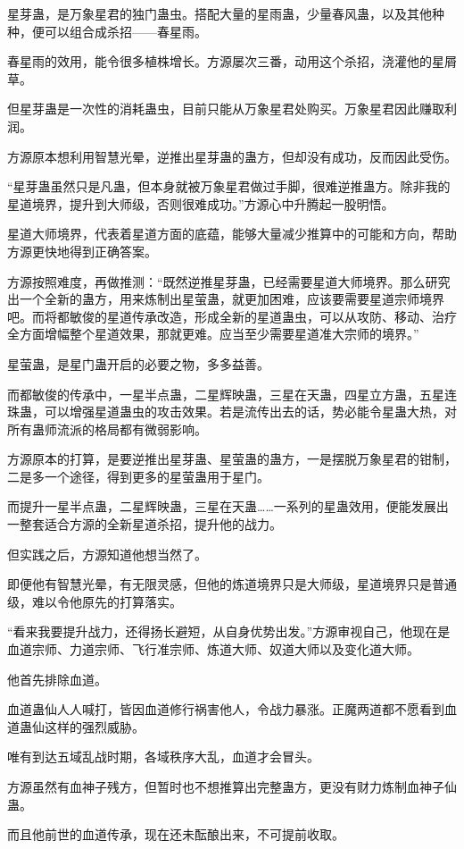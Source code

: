 \begin{this_body}
星芽蛊，是万象星君的独门蛊虫。搭配大量的星雨蛊，少量春风蛊，以及其他种种，便可以组合成杀招——春星雨。

春星雨的效用，能令很多植株增长。方源屡次三番，动用这个杀招，浇灌他的星屑草。

但星芽蛊是一次性的消耗蛊虫，目前只能从万象星君处购买。万象星君因此赚取利润。

方源原本想利用智慧光晕，逆推出星芽蛊的蛊方，但却没有成功，反而因此受伤。

“星芽蛊虽然只是凡蛊，但本身就被万象星君做过手脚，很难逆推蛊方。除非我的星道境界，提升到大师级，否则很难成功。”方源心中升腾起一股明悟。

星道大师境界，代表着星道方面的底蕴，能够大量减少推算中的可能和方向，帮助方源更快地得到正确答案。

方源按照难度，再做推测：“既然逆推星芽蛊，已经需要星道大师境界。那么研究出一个全新的蛊方，用来炼制出星萤蛊，就更加困难，应该要需要星道宗师境界吧。而将都敏俊的星道传承改造，形成全新的星道蛊虫，可以从攻防、移动、治疗全方面增幅整个星道效果，那就更难。应当至少需要星道准大宗师的境界。”

星萤蛊，是星门蛊开启的必要之物，多多益善。

而都敏俊的传承中，一星半点蛊，二星辉映蛊，三星在天蛊，四星立方蛊，五星连珠蛊，可以增强星道蛊虫的攻击效果。若是流传出去的话，势必能令星蛊大热，对所有蛊师流派的格局都有微弱影响。

方源原本的打算，是要逆推出星芽蛊、星萤蛊的蛊方，一是摆脱万象星君的钳制，二是多一个途径，得到更多的星萤蛊用于星门。

而提升一星半点蛊，二星辉映蛊，三星在天蛊……一系列的星蛊效用，便能发展出一整套适合方源的全新星道杀招，提升他的战力。

但实践之后，方源知道他想当然了。

即便他有智慧光晕，有无限灵感，但他的炼道境界只是大师级，星道境界只是普通级，难以令他原先的打算落实。

“看来我要提升战力，还得扬长避短，从自身优势出发。”方源审视自己，他现在是血道宗师、力道宗师、飞行准宗师、炼道大师、奴道大师以及变化道大师。

他首先排除血道。

血道蛊仙人人喊打，皆因血道修行祸害他人，令战力暴涨。正魔两道都不愿看到血道蛊仙这样的强烈威胁。

唯有到达五域乱战时期，各域秩序大乱，血道才会冒头。

方源虽然有血神子残方，但暂时也不想推算出完整蛊方，更没有财力炼制血神子仙蛊。

而且他前世的血道传承，现在还未酝酿出来，不可提前收取。


\end{this_body}
